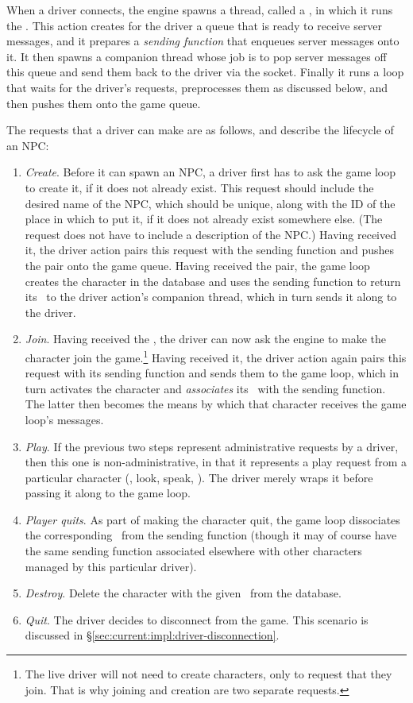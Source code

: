 When a driver connects, the engine spawns a thread, called a
, in which it runs the .
This action creates for the driver a queue that is ready to receive
server messages, and it prepares a {\em sending function} that enqueues server
messages onto it.
It then spawns a companion thread whose job is to pop server messages off this
queue and send them back to the driver via the socket.
Finally it runs a loop that waits for the driver's requests, preprocesses
them as discussed below, and then pushes them onto the game queue.

The requests that a driver can make are as follows, and describe the lifecycle
of an NPC:
\begin{enumerate}
    \item {\em Create}.
    Before it can spawn an NPC, a driver first has to ask the game loop to
    create it, if it does not already exist.
    This request should include the desired name of the NPC, which should be
    unique, along with the ID of the place in which to put it, if it does not
    already exist somewhere else.
    (The request does not have to include a description of the NPC\@.)
    Having received it, the driver action pairs this request with the
    sending function and pushes the pair onto the game queue.
    Having received the pair, the game loop creates the character in the
    database and uses the sending function to return its \cid\ to the driver
    action's companion thread, which in turn sends it along to the driver.
    \item {\em Join}.
    Having received the \cid, the driver can now ask the
    engine to make the character join the game.\footnote{The live driver will
    not need to create characters, only to request that they join.
    That is why joining and creation are two separate requests.}
    Having received it, the driver action again pairs this request with its
    sending function and sends them to the game loop, which in turn activates
    the character and {\em associates} its \cid\ with the sending function.
    The latter then becomes the means by which that character receives the game
    loop's messages.
    \item {\em Play}.
    If the previous two steps represent administrative requests by a driver,
    then this one is non-administrative, in that it represents a play request
    from a particular character (\eg, look, speak, \etc).
    The driver merely wraps it before passing it along to the game loop.
    \item {\em Player quits}.
    As part of making the character quit, the game loop dissociates the
    corresponding \cid\ from the sending function (though
    it may of course have the same sending function associated elsewhere with
    other characters managed by this particular driver).
    \item {\em Destroy}.
    Delete the character with the given \cid\ from the database.
    \item {\em Quit}.
    The driver decides to disconnect from the game.
    This scenario is discussed in \S\ref{sec:current:impl:driver-disconnection}.
\end{enumerate}
